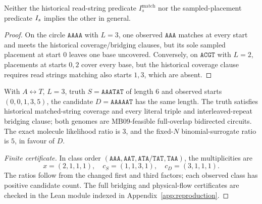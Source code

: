 \begin{proposition}
\label{prop:historical-source}
Neither the historical read-string predicate
$I_s^{\mathrm{match}}$ nor the sampled-placement predicate
$I_s$ implies the other in general.
\end{proposition}
\begin{proof}
On the circle $\texttt{AAAA}$ with $L=3$, one observed
$\texttt{AAA}$ matches at every start and meets the
historical coverage/bridging clauses, but its sole sampled
placement at start $0$ leaves one base uncovered.
Conversely, on $\texttt{ACGT}$ with $L=2$, placements at
starts $0,2$ cover every base, but the historical coverage
clause requires read strings matching also starts $1,3$,
which are absent.
\end{proof}

\begin{theorem}
\label{thm:cex-historical-W1}
With $A\leftrightarrow T$, $L=3$, truth
$S=\texttt{AAATAT}$ of length $6$ and observed starts
$(0,0,1,3,5)$, the candidate $D=\texttt{AAAAAT}$
has the same length. The truth satisfies historical
matched-string coverage and every literal triple
and interleaved-repeat bridging clause; both genomes
are MB09-feasible full-overlap bidirected circuits.
The exact molecule likelihood ratio is $3$, and the
fixed-$N$ binomial-surrogate ratio is $5$, in favour
of $D$.
\end{theorem}
\begin{proof}[Finite certificate]
In class order
$(\texttt{AAA},\texttt{AAT},\texttt{ATA/TAT},\texttt{TAA})$,
the multiplicities are
\[
  x=(2,1,1,1),\quad c_S=(1,1,3,1),\quad c_D=(3,1,1,1).
\]
The ratios follow from the changed first and third
factors; each observed class has positive candidate
count. The full bridging and physical-flow certificates are
checked in the Lean module indexed in
Appendix~\ref{app:reproduction}.
\end{proof}

